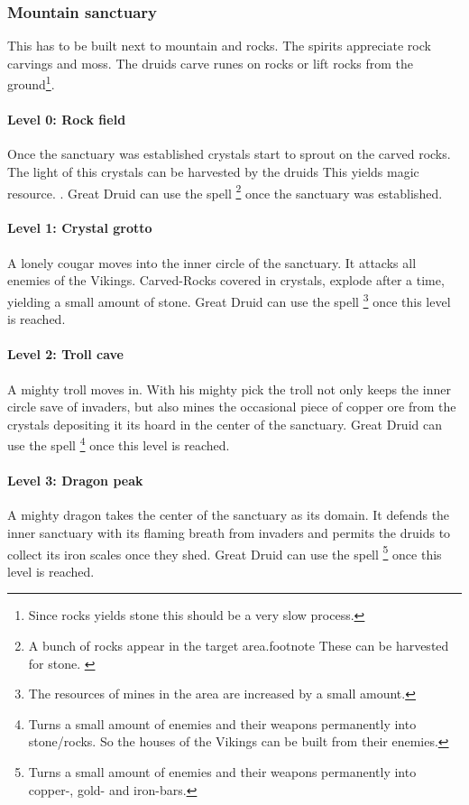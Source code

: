 \documentclass[a4paper]{book}
\begin{document}
		\subsubsection{Mountain sanctuary}
			This has to be built next to mountain and rocks.
			The spirits appreciate rock carvings and moss.
			The druids carve runes on rocks or lift rocks from the ground\footnote{
				Since rocks yields stone this should be a very slow process.
			}.

			\paragraph{Level 0: Rock field}
				Once the sanctuary was established crystals start to sprout on the carved rocks.
				The light of this crystals can be harvested by the druids{
					This yields magic resource.
				}.
				Great Druid can use the spell \footnote{
					A bunch of rocks appear in the target area.footnote{
						These can be harvested for stone.
					}
				} once the sanctuary was established.

			\paragraph{Level 1: Crystal grotto}
				A lonely cougar moves into the inner circle of the sanctuary.
				It attacks all enemies of the \gls{Vikings}.
				Carved-Rocks covered in crystals, explode after a time,
				yielding a small amount of stone.
				Great Druid can use the spell \footnote{
					The resources of mines in the area are increased by a small amount.
				} once this level is reached.

			\paragraph{Level 2: Troll cave}
				A mighty troll moves in.
				With his mighty pick the troll not only keeps the inner circle save of invaders,
				but also mines the occasional piece of copper ore from the crystals depositing it its hoard
				in the center of the sanctuary.
				Great Druid can use the spell \footnote{
					Turns a small amount of enemies and their weapons permanently into stone/rocks.
					So the houses of the \gls{Vikings} can be built from their enemies.
				} once this level is reached.

			\paragraph{Level 3: Dragon peak}
				A mighty dragon takes the center of the sanctuary as its domain.
				It defends the inner sanctuary with its flaming breath from invaders
				and permits the druids to collect its iron scales once they shed.
				Great Druid can use the spell \footnote{
					Turns a small amount of enemies and their weapons permanently into copper-, gold- and iron-bars.
				} once this level is reached.
\end{document}

